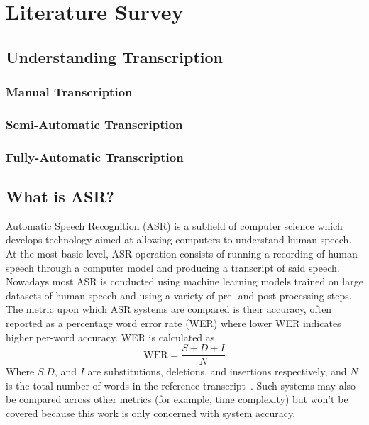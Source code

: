 \chapter{Literature Survey}\label{ch:literature-survey}

\section{Understanding Transcription}\label{sec:transcription}

\subsection{Manual Transcription}\label{subsec:manual-transcription}

\subsection{Semi-Automatic Transcription}\label{subsec:semi-auto-transcription}

\subsection{Fully-Automatic Transcription}\label{subsec:full-auto-transcription}


\section{What is ASR?}\label{sec:what-is-asr}

Automatic Speech Recognition (ASR) is a subfield of computer science which develops technology aimed at allowing computers to understand human speech.
At the most basic level, ASR operation consists of running a recording of human speech through a computer model and producing a transcript of said speech.
Nowadays most ASR is conducted using machine learning models trained on large datasets of human speech and using a variety of pre- and post-processing steps.\\

The metric upon which ASR systems are compared is their accuracy, often reported as a percentage word error rate (WER) where lower WER indicates higher per-word accuracy.
WER is calculated as
\[
    \text{WER} = \frac{S + D + I}{N}
\]
Where $S$,$D$, and $I$ are substitutions, deletions, and insertions respectively, and $N$ is the total number of words in the reference transcript~\cite{gaikwad2010review}.
Such systems may also be compared across other metrics (for example, time complexity) but won't be covered because this work is only concerned with system accuracy.

